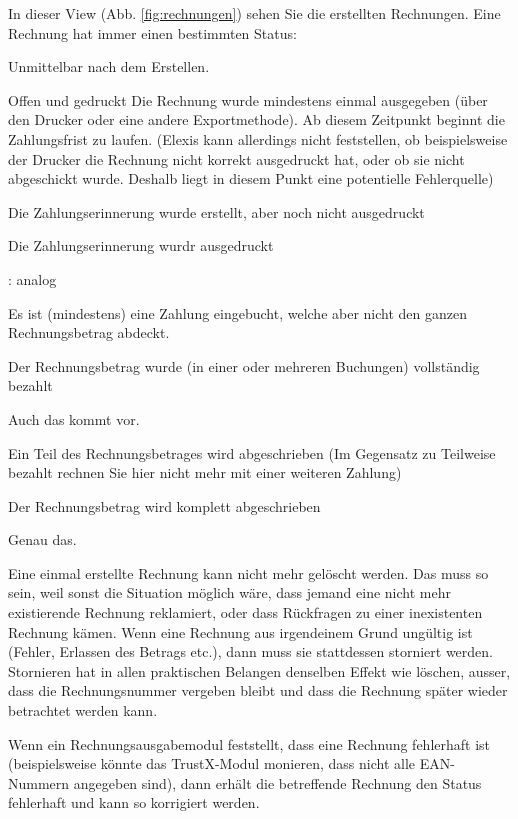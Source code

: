 In dieser View (Abb. \ref{fig:rechnungen}) sehen Sie die erstellten Rechnungen. Eine Rechnung hat immer einen bestimmten Status:
\begin{description}
    \item [Offen] Unmittelbar nach dem Erstellen.
    \item{Offen und gedruckt} Die Rechnung wurde mindestens einmal ausgegeben (über den Drucker oder eine andere Exportmethode). Ab diesem Zeitpunkt beginnt die Zahlungsfrist zu laufen. (Elexis kann allerdings nicht feststellen, ob beispielsweise der Drucker die Rechnung nicht korrekt ausgedruckt hat, oder ob sie nicht abgeschickt wurde. Deshalb liegt in diesem Punkt eine potentielle Fehlerquelle)
    \item[Zahlungserinnerung] Die Zahlungserinnerung wurde erstellt, aber noch nicht ausgedruckt
    \item[ZE gedruckt] Die Zahlungserinnerung wurdr ausgedruckt
    \item [2. Mahnung erstellt, 2. Mahnung gedruckt, 3. Mahnung erstellt, 3. Mahnung gedruckt]: analog
    \item[Teilweise bezahlt] Es ist (mindestens) eine Zahlung eingebucht, welche aber nicht den ganzen Rechnungsbetrag abdeckt.
    \item[bezahlt] Der Rechnungsbetrag wurde (in einer oder mehreren Buchungen) vollständig bezahlt
    \item [zuviel bezahlt] Auch das kommt vor.
    \item [Teilverlust] Ein Teil des Rechnungsbetrages wird abgeschrieben (Im Gegensatz zu \glqq Teilweise bezahlt\grqq{} rechnen Sie hier nicht mehr mit einer weiteren Zahlung)
    \item [Totalverlust] Der Rechnungsbetrag wird komplett abgeschrieben
    \item [In Betreibung] Genau das.
    \item [Storniert] Eine einmal erstellte Rechnung kann nicht mehr gelöscht werden. Das muss so sein, weil sonst die Situation möglich wäre, dass jemand eine nicht mehr existierende Rechnung reklamiert, oder dass Rückfragen zu einer inexistenten Rechnung kämen. Wenn eine Rechnung aus irgendeinem Grund ungültig ist (Fehler, Erlassen des Betrags etc.), dann muss sie stattdessen storniert werden. Stornieren hat in allen praktischen Belangen denselben Effekt wie löschen, ausser, dass die Rechnungsnummer vergeben bleibt und dass die Rechnung später wieder betrachtet werden kann.
    \item [fehlerhaft] Wenn ein Rechnungsausgabemodul feststellt, dass eine Rechnung fehlerhaft ist (beispielsweise könnte das TrustX-Modul monieren, dass nicht alle EAN-Nummern angegeben sind), dann erhält die betreffende Rechnung den Status fehlerhaft und kann so korrigiert werden.

\end{description}
